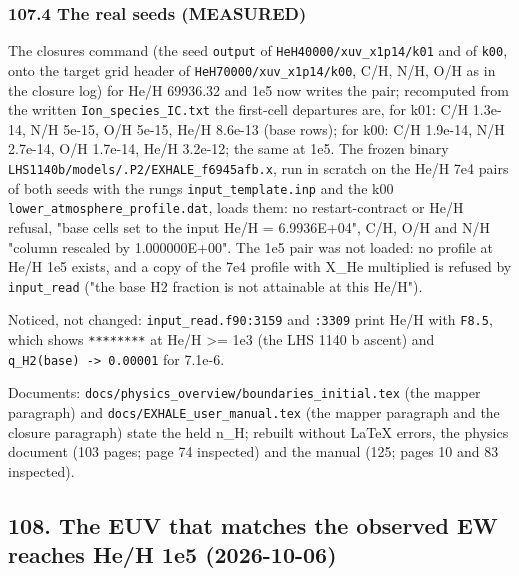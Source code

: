\documentclass[english,a4paper]{my_memo}
\begin{document}
\subsubsection{107.4 The real seeds (MEASURED)}\label{1074-the-real-seeds-measured}

The closure\textquotesingle s command (the seed \texttt{output} of \texttt{HeH40000/xuv\_x1p14/k01} and
of \texttt{k00}, onto the target grid header of \texttt{HeH70000/xuv\_x1p14/k00}, C/H,
N/H, O/H as in the closure log) for He/H 69936.32 and 1e5 now writes the pair; recomputed
from the written \texttt{Ion\_species\_IC.txt} the first-cell departures are, for k01:
C/H 1.3e-14, N/H 5e-15, O/H 5e-15, He/H 8.6e-13 (base rows); for k00:
C/H 1.9e-14, N/H 2.7e-14, O/H 1.7e-14, He/H 3.2e-12; the same at 1e5.
The frozen binary \texttt{LHS1140b/models/.P2/EXHALE\_f6945afb.x}, run in scratch on
the He/H 7e4 pairs of both seeds with the rung\textquotesingle s \texttt{input\_template.inp} and
the k00 \texttt{lower\_atmosphere\_profile.dat}, loads them: no restart-contract or
He/H refusal, "base cells set to the input He/H = 6.9936E+04", C/H, O/H and
N/H "column rescaled by 1.000000E+00". The 1e5 pair was not loaded: no
profile at He/H 1e5 exists, and a copy of the 7e4 profile with X\_He
multiplied is refused by \texttt{input\_read} ("the base H2 fraction is not
attainable at this He/H").

Noticed, not changed: \texttt{input\_read.f90:3159} and \texttt{:3309} print He/H with
\texttt{F8.5}, which shows \texttt{********} at He/H \textgreater= 1e3 (the LHS 1140 b ascent) and
\texttt{q\_H2(base)\ -\textgreater{}\ 0.00001} for 7.1e-6.

Documents: \texttt{docs/physics\_overview/boundaries\_initial.tex} (the mapper
paragraph) and \texttt{docs/EXHALE\_user\_manual.tex} (the mapper paragraph and the
closure paragraph) state the held n\_H; rebuilt without LaTeX errors, the
physics document (103 pages; page 74 inspected) and the manual (125; pages 10
and 83 inspected).

\subsection{108. The EUV that matches the observed EW reaches He/H 1e5 (2026-10-06)}\label{108-the-euv-that-matches-the-observed-ew-reaches-heh-1e5-2026-10-06}
\end{document}

